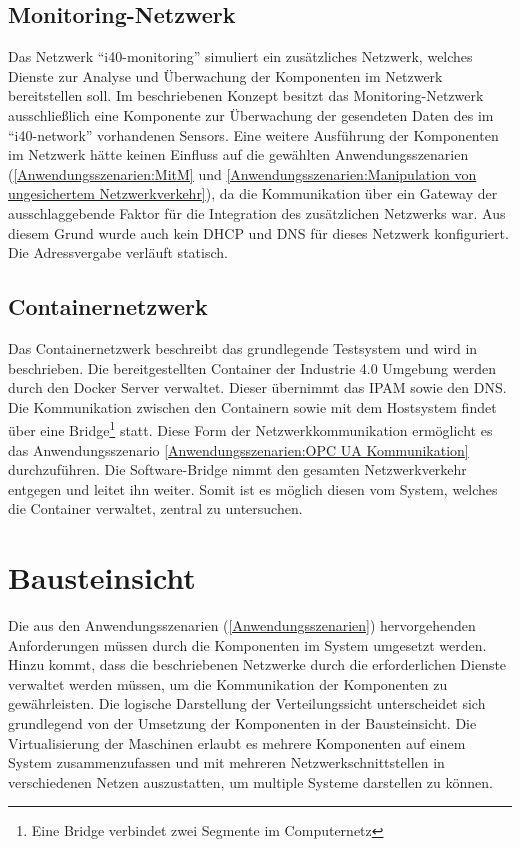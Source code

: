 \subsection{Monitoring-Netzwerk}
Das Netzwerk "`i40-monitoring"' simuliert ein zusätzliches Netzwerk, welches Dienste zur Analyse und Überwachung der Komponenten im Netzwerk bereitstellen soll. Im beschriebenen Konzept besitzt das Monitoring-Netzwerk ausschließlich eine Komponente zur Überwachung der gesendeten Daten des im "`i40-network"' vorhandenen Sensors. Eine weitere Ausführung der Komponenten im Netzwerk hätte keinen Einfluss auf die gewählten Anwendungsszenarien (\autoref{Anwendungsszenarien:MitM} und \autoref{Anwendungsszenarien:Manipulation von ungesichertem Netzwerkverkehr}), da die Kommunikation über ein Gateway der ausschlaggebende Faktor für die Integration des zusätzlichen Netzwerks war. Aus diesem Grund wurde auch kein \ac{DHCP} und \ac{DNS} für dieses Netzwerk konfiguriert. Die Adressvergabe verläuft statisch.

\subsection{Containernetzwerk}
Das Containernetzwerk beschreibt das grundlegende Testsystem und wird in \cite{Weber2018} beschrieben. Die bereitgestellten Container der Industrie 4.0 Umgebung werden durch den Docker Server verwaltet. Dieser übernimmt das \ac{IPAM} sowie den \ac{DNS}. Die Kommunikation zwischen den Containern sowie mit dem Hostsystem findet über eine Bridge\footnote{Eine Bridge verbindet zwei Segmente im Computernetz} statt. Diese Form der Netzwerkkommunikation ermöglicht es das Anwendungsszenario \autoref{Anwendungsszenarien:OPC UA Kommunikation} durchzuführen. Die Software-Bridge nimmt den gesamten Netzwerkverkehr entgegen und leitet ihn weiter. Somit ist es möglich diesen vom System, welches die Container verwaltet, zentral zu untersuchen.

\section{Bausteinsicht}
Die aus den Anwendungsszenarien (\autoref{Anwendungsszenarien}) hervorgehenden Anforderungen müssen durch die Komponenten im System umgesetzt werden. Hinzu kommt, dass die beschriebenen Netzwerke durch die erforderlichen Dienste verwaltet werden müssen, um die Kommunikation der Komponenten zu gewährleisten. Die logische Darstellung der Verteilungssicht unterscheidet sich grundlegend von der Umsetzung der Komponenten in der Bausteinsicht. Die Virtualisierung der Maschinen erlaubt es mehrere Komponenten auf einem System zusammenzufassen und mit mehreren Netzwerkschnittstellen in verschiedenen Netzen auszustatten, um multiple Systeme darstellen zu können.

